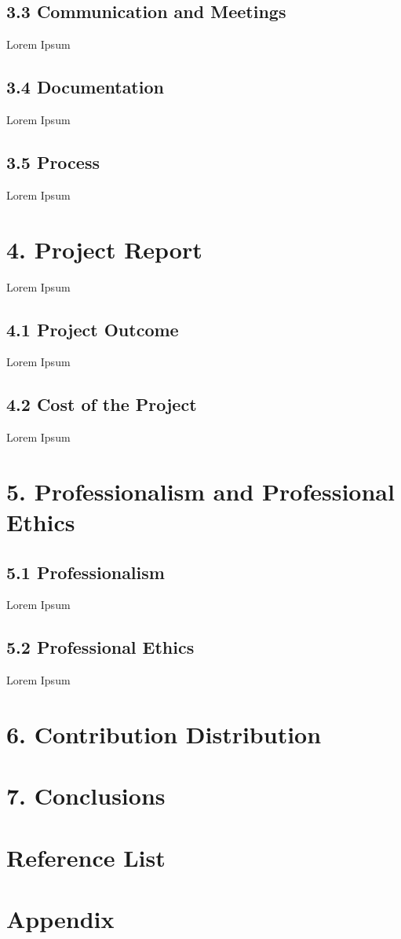 \documentclass[11pt]{article}
\begin{document}
\subsection{3.3 Communication and Meetings}
Lorem Ipsum

\subsection{3.4 Documentation}
Lorem Ipsum

\subsection{3.5 Process}
Lorem Ipsum



\section{4. Project Report}
Lorem Ipsum

\subsection{4.1 Project Outcome}
Lorem Ipsum

\subsection{4.2 Cost of the Project}
Lorem Ipsum



\section{5. Professionalism and Professional Ethics}

\subsection{5.1 Professionalism}
Lorem Ipsum

\subsection{5.2 Professional Ethics}
Lorem Ipsum



\section{6. Contribution Distribution}



\section{7. Conclusions}




\section{Reference List}



\section{Appendix}
\end{document}
